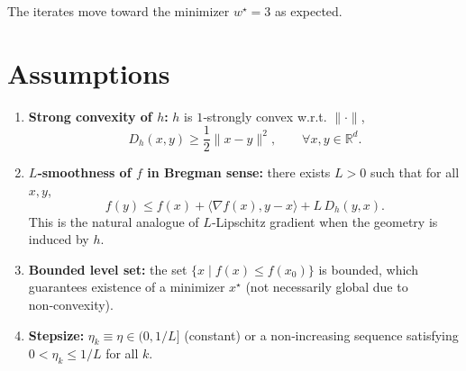 \documentclass{article}
\newcommand{\breg}[2]{D_h(#1,#2)}
\begin{document}
The iterates move toward the minimizer $w^$ as expected.

\newpage
\section*{Assumptions}
\begin{enumerate}
\item[(A1)] \textbf{Strong convexity of $h$:} $h$ is $1$‑strongly convex w.r.t. $\|\cdot\|$,
\[
\breg{x}{y}\ge\frac12\|x-y\|^{2},\qquad\forall x,y\in\mathbb{R}^d.
\]

\item[(A2)] \textbf{$L$‑smoothness of $f$ in Bregman sense:} there exists $L>0$ such that for all $x,y$,
\begin{equation}\label{eq:smooth}
f(y)\le f(x)+\langle\nabla f(x),y-x\rangle+L\,\breg{y}{x}.
\end{equation}
This is the natural analogue of $L$‑Lipschitz gradient when the geometry is induced by $h$.

\item[(A3)] \textbf{Bounded level set:} the set $\{x\mid f(x)\le f(x_0)\}$ is bounded, which guarantees existence of a minimizer $x^\star$ (not necessarily global due to non‑convexity).

\item[(A4)] \textbf{Stepsize:} $\eta_k\equiv\eta\in(0,1/L]$ (constant) or a non‑increasing sequence satisfying $0<\eta_k/L$ for all $k$.
\end{enumerate}
\end{document}
